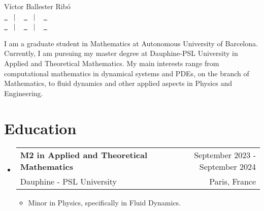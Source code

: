 \documentclass[a4paper,11pt]{article}
\makeatletter
\newcommand{\resumeQuadHeading}[4]{
  \item
  \begin{tabular*}{0.96\textwidth}[t]{l@{\extracolsep{\fill}}r}
    \textbf{#1} & \small #2 \\
    \small#3 & \small #4 \\
  \end{tabular*}
}
\newcommand{\resumeHeadingListStart}{
  \begin{itemize}[leftmargin=0.15in, label={}]
}
\newcommand{\resumeHeadingListEnd}{\end{itemize}}
\makeatother
\begin{document}
\begin{center}
  {\Huge Víctor Ballester Ribó\vspace{2pt}} \\[1.25pc]
  \href{https://victorballester7.github.io}{\faLink \ } \ $|$ \ %
  \href{https://www.linkedin.com/in/victorballester7}{\faLinkedinSquare \ } \ $|$ \ %
  \href{https://www.github.com/victorballester7}{\faGithub \ } \\[0.1pc] %
  \href{tel:+33765750262}{\faPhone \ } \ $|$ \ %
  \href{mailto:victor.ballester-ribo@dauphine.eu}{\faEnvelope \ } \ $|$ \ %
  \href{https://maps.app.goo.gl/mBsBKy4iHiBFkVGz5}{\faHome \ } \\[1.5pc] %
\end{center}

\begin{justify}
  I am a graduate student in Mathematics at Autonomous University of Bar\-ce\-lo\-na. Currently, I am pursuing my master degree at Dauphine-PSL University in Applied and Theoretical Mathematics. My main interests range from computational mathematics in dynamical systems and PDEs, on the branch of Math\-e\-mat\-ics, to fluid dynamics and other applied aspects in Physics and Engineering.
\end{justify}



\section{Education}
\resumeHeadingListStart{}
\resumeQuadHeading{M2 in Applied and Theoretical Mathematics}{September 2023 - September 2024}
{Dauphine - PSL University}{Paris, France}
\begin{itemize}[leftmargin=3em, itemsep=0.1em, topsep=2pt]
  \item \small Minor in Physics, specifically in Fluid Dynamics.
\end{itemize}
\resumeHeadingListEnd{}
\end{document}
